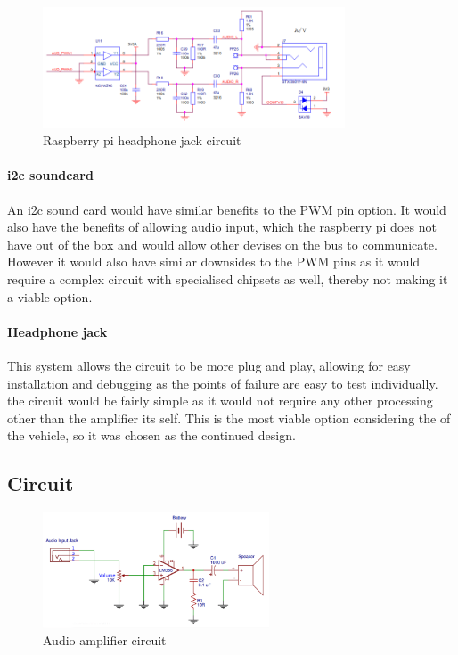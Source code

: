\begin{figure}[h]%
	\centering
	\includegraphics[width = 0.8\textwidth]{"assets/pi_audio_schematic"}
	\caption{Raspberry pi headphone jack circuit \cite{ras_pi_schematic}} 
	\label{fig:pi_audio_schematic}
\end{figure}

\paragraph*{i2c soundcard}
An i2c sound card would have similar benefits to the PWM pin option. It would also have the benefits of allowing audio input, which the raspberry pi does not have out of the box and would allow other devises on the bus to communicate. However it would also have similar downsides to the PWM pins as it would require a complex circuit with specialised chipsets as well, thereby not making it a viable option.  

\paragraph*{Headphone jack}
This system allows the circuit to be more plug and play, allowing for easy installation and debugging as the points of failure are easy to test individually. the circuit would be fairly simple as it would not require any other processing other than the amplifier its self. This is the most viable option considering the  of the vehicle, so it was chosen as the continued design.

\subsection{Circuit}

\begin{figure}[h]%
	\centering
	\includegraphics[width = 0.6\textwidth]{"assets/audio_amplifier"}
	\caption{Audio amplifier circuit \cite{amp_circuit}}
	\label{fig:amp_circuit}
\end{figure}

